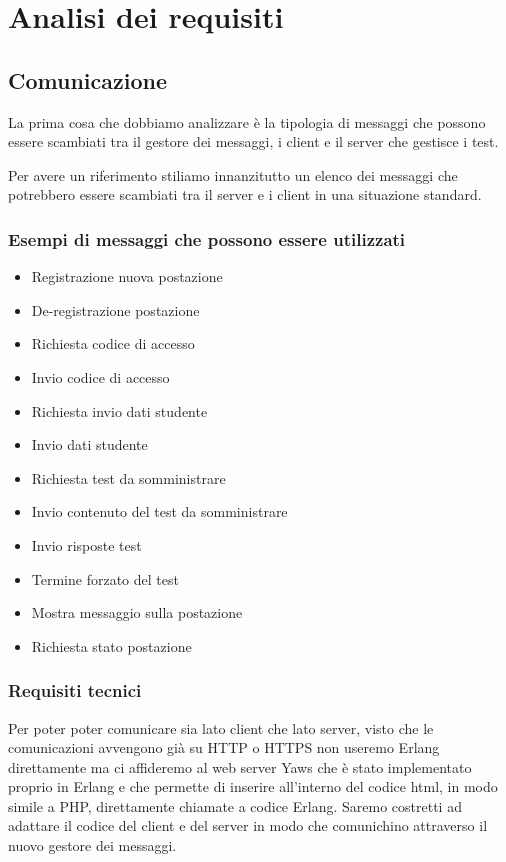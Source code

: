 \chapter{Analisi dei requisiti}

\section{Comunicazione}
La prima cosa che dobbiamo analizzare \`e la tipologia di messaggi che possono essere scambiati tra il gestore dei messaggi, i client e il server che gestisce i test.

Per avere un riferimento stiliamo innanzitutto un elenco dei messaggi che potrebbero essere scambiati tra il server e i client in una situazione standard.
\subsection{Esempi di messaggi che possono essere utilizzati}
\begin{itemize}
	\item Registrazione nuova postazione
	\item De-registrazione postazione
	\item Richiesta codice di accesso
	\item Invio codice di accesso
	\item Richiesta invio dati studente
	\item Invio dati studente
	\item Richiesta test da somministrare
	\item Invio contenuto del test da somministrare
	\item Invio risposte test
	\item Termine forzato del test
	\item Mostra messaggio sulla postazione
	\item Richiesta stato postazione
\end{itemize}
\subsection{Requisiti tecnici}
Per poter poter comunicare sia lato client che lato server, visto che le comunicazioni avvengono gi\`a su HTTP o HTTPS non useremo Erlang direttamente ma ci affideremo al web server Yaws \cite{web:yaws} che \`e stato implementato proprio in Erlang e che permette di inserire all'interno del codice html, in modo simile a PHP, direttamente chiamate a codice Erlang.
Saremo costretti ad adattare il codice del client e del server in modo che comunichino attraverso il nuovo gestore dei messaggi.

